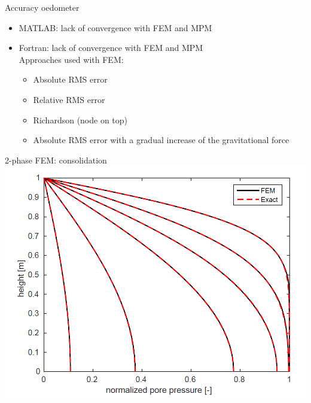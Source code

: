 \documentclass[mathserif,professionalfont,hyperref={pdfpagelabels=false}]{beamer}
\begin{document}
\begin{frame}{Accuracy oedometer}
\begin{itemize}
\item MATLAB: lack of convergence with FEM and MPM
\pause
\item Fortran: lack of convergence with FEM and MPM\\
\pause
Approaches used with FEM: 
\begin{itemize}
\item Absolute RMS error
\item Relative RMS error
\item Richardson (node on top)
\item Absolute RMS error with a gradual increase of the gravitational force
\end{itemize}
\end{itemize}
\end{frame}
\begin{frame}{2-phase FEM: consolidation}
\centering
\includegraphics[width=0.7\paperwidth,height=0.7\paperheight]{images/consolidation}
\end{frame}
\end{document}
